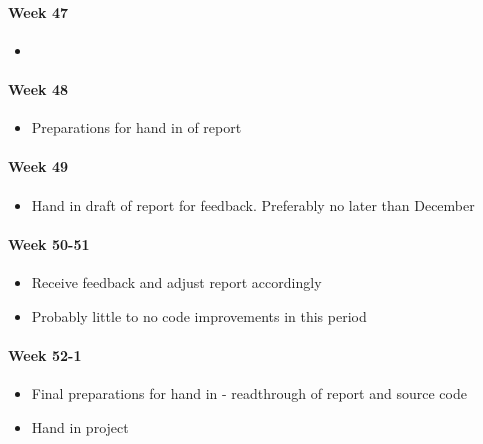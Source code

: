 \paragraph{Week 47}
\begin{itemize}
    \item 
\end{itemize}
\paragraph{Week 48}
\begin{itemize}
    \item Preparations for hand in of report
\end{itemize}
\paragraph{Week 49}
\begin{itemize}
    \item Hand in draft of report for feedback. Preferably no later than  December
\end{itemize}
\paragraph{Week 50-51}
\begin{itemize}
    \item Receive feedback and adjust report accordingly
    \item Probably little to no code improvements in this period
\end{itemize}
\paragraph{Week 52-1}
\begin{itemize}
    \item Final preparations for hand in - readthrough of report and source code
    \item Hand in project
\end{itemize}